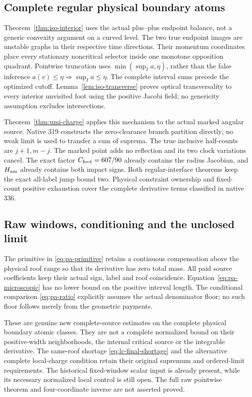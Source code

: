 \subsection*{Complete regular physical boundary atoms}
Theorem~\ref{thm:iso-interior} uses the actual plus--plus
endpoint balance, not a generic convexity argument on a
curved level. The two true endpoint images are unstable
graphs in their respective time directions. Their momentum
coordinates place every stationary noncritical selector
inside one monotone opposition quadrant. Pointwise
truncation uses $\min(\sup_Ia,\eta)$, rather than the false
inference $a(v)\le\eta\Rightarrow\sup_Ia\le\eta$.
The complete interval sums precede the optimized cutoff.
Lemma~\ref{lem:iso-transverse} proves optical transversality
to every interior unvisited foot using the positive Jacobi
field; no genericity assumption excludes intersections.

Theorem~\ref{thm:umi-charge} applies this mechanism to
the actual marked angular source. Native 319 constructs
the zero-clearance branch partition directly; no weak
limit is used to transfer a sum of suprema. The true
inclusive half-counts are $j+1,m-j$. The marked point
adds no reflection and its two clock variations cancel.
The exact factor $C_{\rm foot}=607/90$ already contains
the radius Jacobian, and $H_{\rm nm}$ already contains
both impact signs. Both regular-interface theorems keep
the exact all-label jump bound two. Physical constraint
ownership and fixed-count positive exhaustion cover the
complete derivative terms classified in native 336.

\subsection*{Raw windows, conditioning and the unclosed limit}
The primitive in \eqref{eq:pa-primitive} retains a continuous
compensation above the physical roof range so that its
derivative has zero total mass. All paid source coefficients
keep their actual sign, label and roof coincidence.
Equation~\eqref{eq:pa-microscopic} has no lower bound on
the positive interval length. The conditional comparison
\eqref{eq:pa-ratio} explicitly assumes the actual
denominator floor; no such floor follows merely from
the geometric payments.

These are genuine new complete-source estimates on the
complete physical boundary atomic classes. They are not a complete
normalized bound on their positive-width neighborhoods,
the internal critical source or the integrable derivative.
The same-roof shortage \eqref{eq:lc-final-shortage} and
the alternative complete local-charge condition retain
their original supremum and ordered-limit requirements.
The historical fixed-window scalar input is already
present, while its necessary normalized local control
is still open. The full raw pointwise theorem and
four-coordinate inverse are not asserted proved.
